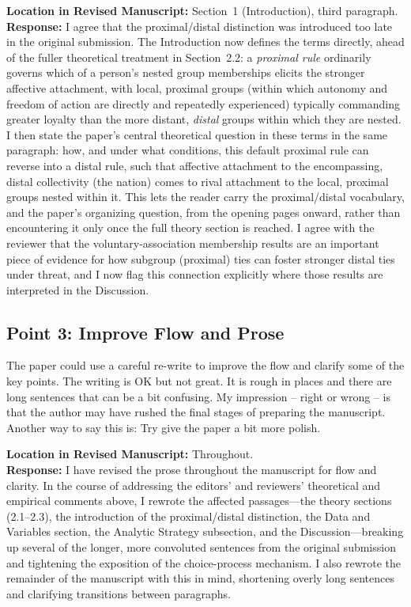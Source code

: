 \documentclass[11pt]{article}
\begin{document}
\noindent\textbf{Location in Revised Manuscript:} Section~1 (Introduction), third paragraph.\\[4pt]
\textbf{Response:} I agree that the proximal/distal distinction was introduced too late in the original submission. The Introduction now defines the terms directly, ahead of the fuller theoretical treatment in Section~2.2: a \textit{proximal rule} ordinarily governs which of a person's nested group memberships elicits the stronger affective attachment, with local, proximal groups (within which autonomy and freedom of action are directly and repeatedly experienced) typically commanding greater loyalty than the more distant, \textit{distal} groups within which they are nested. I then state the paper's central theoretical question in these terms in the same paragraph: how, and under what conditions, this default proximal rule can reverse into a distal rule, such that affective attachment to the encompassing, distal collectivity (the nation) comes to rival attachment to the local, proximal groups nested within it. This lets the reader carry the proximal/distal vocabulary, and the paper's organizing question, from the opening pages onward, rather than encountering it only once the full theory section is reached. I agree with the reviewer that the voluntary-association membership results are an important piece of evidence for how subgroup (proximal) ties can foster stronger distal ties under threat, and I now flag this connection explicitly where those results are interpreted in the Discussion.

\subsection*{Point 3: Improve Flow and Prose}

\begin{reviewercomment}
The paper could use a careful re-write to improve the flow and clarify some of the key points. The writing is OK but not great. It is rough in places and there are long sentences that can be a bit confusing. My impression -- right or wrong -- is that the author may have rushed the final stages of preparing the manuscript. Another way to say this is: Try give the paper a bit more polish.
\end{reviewercomment}

\noindent\textbf{Location in Revised Manuscript:} Throughout.\\[4pt]
\textbf{Response:} I have revised the prose throughout the manuscript for flow and clarity. In the course of addressing the editors' and reviewers' theoretical and empirical comments above, I rewrote the affected passages---the theory sections (2.1--2.3), the introduction of the proximal/distal distinction, the Data and Variables section, the Analytic Strategy subsection, and the Discussion---breaking up several of the longer, more convoluted sentences from the original submission and tightening the exposition of the choice-process mechanism. I also rewrote the remainder of the manuscript with this in mind, shortening overly long sentences and clarifying transitions between paragraphs.
\end{document}
